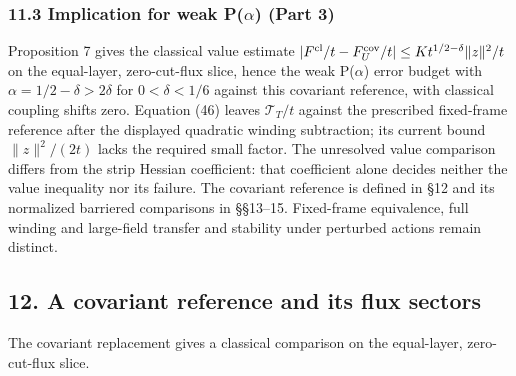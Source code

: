 \documentclass[11pt,a4paper]{article}
\begin{document}
\hypertarget{implication-for-weak-palpha-part-3}{%
\subsubsection{\texorpdfstring{11.3 Implication for weak P(\(\alpha\))
(Part
3)}{11.3 Implication for weak P(\textbackslash alpha) (Part 3)}}\label{implication-for-weak-palpha-part-3}}

Proposition 7 gives the classical value estimate
\(|F^{\rm cl}/t-F_U^{\rm cov}/t|\le Kt^{1/2-\delta}\|z\|^2/t\) on the
equal-layer, zero-cut-flux slice, hence the weak P(\(\alpha\)) error
budget with \(\alpha=1/2-\delta>2\delta\) for \(0<\delta<1/6\) against
this covariant reference, with classical coupling shifts zero. Equation
(46) leaves \(\mathcal T_T/t\) against the prescribed fixed-frame
reference after the displayed quadratic winding subtraction; its current
bound \(\|z\|^2/(2t)\) lacks the required small factor. The unresolved
value comparison differs from the strip Hessian coefficient: that
coefficient alone decides neither the value inequality nor its failure.
The covariant reference is defined in §12 and its normalized barriered
comparisons in §§13--15. Fixed-frame equivalence, full winding and
large-field transfer and stability under perturbed actions remain
distinct.

\hypertarget{a-covariant-reference-and-its-flux-sectors}{%
\subsection{12. A covariant reference and its flux
sectors}\label{a-covariant-reference-and-its-flux-sectors}}

The covariant replacement gives a classical comparison on the
equal-layer, zero-cut-flux slice.
\end{document}
